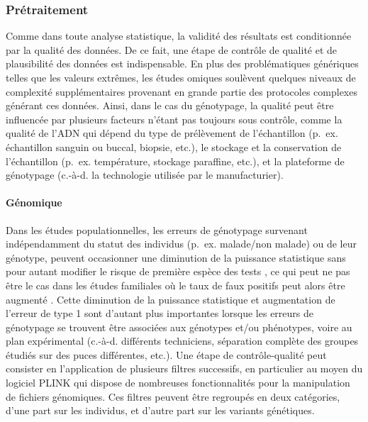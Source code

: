\documentclass[11pt,a4paper,notrimn]{krantz}
\let\oldparagraph\paragraph
\renewcommand{\paragraph}[1]{\oldparagraph{#1}\mbox{}}
\theoremstyle{definition}
\theoremstyle{definition}
\theoremstyle{remark}
\begin{document}
\subsubsection{Prétraitement}\label{pretraitement}

Comme dans toute analyse statistique, la validité des résultats est
conditionnée par la qualité des données. De ce fait, une étape de
contrôle de qualité et de plausibilité des données est indispensable. En
plus des problématiques génériques telles que les valeurs extrêmes, les
études omiques soulèvent quelques niveaux de complexité supplémentaires
provenant en grande partie des protocoles complexes générant ces
données. Ainsi, dans le cas du génotypage, la qualité peut être
influencée par plusieurs facteurs n'étant pas toujours sous contrôle,
comme la qualité de l'ADN qui dépend du type de prélèvement de
l'échantillon (p.~ex. échantillon sanguin ou buccal, biopsie, etc.), le
stockage et la conservation de l'échantillon (p.~ex. température,
stockage paraffine, etc.), et la plateforme de génotypage (c.-à-d. la
technologie utilisée par le manufacturier).

\paragraph{Génomique}\label{genomique}

Dans les études populationnelles, les erreurs de génotypage survenant
indépendamment du statut des individus (p.~ex. malade/non malade) ou de
leur génotype, peuvent occasionner une diminution de la puissance
statistique sans pour autant modifier le risque de première espèce des
tests
\citep{fardo_quality_2009, gordon_assessment_2001, marquard_impact_2009},
ce qui peut ne pas être le cas dans les études familiales où le taux de
faux positifs peut alors être augmenté
\citep{yan_impact_2016, abecasis_impact_2001}. Cette diminution de la
puissance statistique et augmentation de l'erreur de type 1 sont
d'autant plus importantes lorsque les erreurs de génotypage se trouvent
être associées aux génotypes et/ou phénotypes, voire au plan
expérimental (c.-à-d. différents techniciens, séparation complète des
groupes étudiés sur des puces différentes, etc.). Une étape de
contrôle-qualité peut consister en l'application de plusieurs filtres
successifs, en particulier au moyen du logiciel PLINK
\citep{chang_second-generation_2015, purcell_plink_2015}qui dispose de
nombreuses fonctionnalités pour la manipulation de fichiers génomiques.
Ces filtres peuvent être regroupés en deux catégories, d'une part sur
les individus, et d'autre part sur les variants génétiques.
\end{document}
